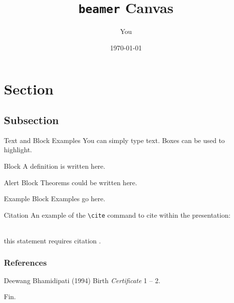 \documentclass{beamer}
\begin{document}
\title{\texttt{beamer} Canvas}
\author{You}
\date{\today}

\begin{frame} 
\titlepage %
\end{frame}


\section{Section}
\subsection{Subsection}

\begin{frame}[fragile]{Text and Block Examples} %
You can simply type text. Boxes can be used to highlight.

\pause %

\begin{block}{Block}
A definition is written here.
\end{block}

\pause

\begin{alertblock}{Alert Block}
Theorems could be written here.
\end{alertblock}

\pause

\begin{exampleblock}{Example Block}
Examples go here.
\end{exampleblock}
\end{frame}


\begin{frame}[fragile]{Citation}
An example of the \verb|\cite| command to cite within the presentation:\\~

this statement requires citation \cite{p1}.
\end{frame}


\begin{frame}
\frametitle{References}
\begin{thebibliography}{99} %
 Deewang Bhamidipati (1994)
\newblock Birth %
\newblock \emph{Certificate} 1 -- 2. %
\end{thebibliography}
\end{frame}


\begin{frame}
\Huge{\centerline{Fin.}}
\end{frame}

\end{document}
